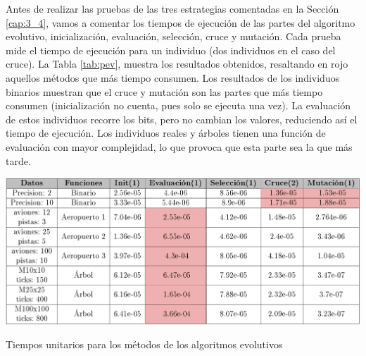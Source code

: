 		Antes de realizar las pruebas de las tres estrategias comentadas en la Sección \ref{cap:3_4}, vamos a comentar los tiempos de ejecución de las partes del algoritmo evolutivo, inicialización, evaluación, selección, cruce y mutación. Cada prueba mide el tiempo de ejecución para un individuo (dos individuos en el caso del cruce). La Tabla \ref{tab:pev}, muestra los resultados obtenidos, resaltando en rojo aquellos métodos que más tiempo consumen. Los resultados de los individuos binarios muestran que el cruce y mutación son las partes que más tiempo consumen (inicialización no cuenta, pues solo se ejecuta una vez). La evaluación de estos individuos recorre los bits, pero no cambian los valores, reduciendo así el tiempo de ejecución. Los individuos reales y árboles tienen una función de evaluación con mayor complejidad, lo que provoca que esta parte sea la que más tarde. 
		
		
		
		\begin{table}[!h]
			\centering
			\includegraphics[width=1\textwidth]{images/chapter_4/tabla_pev}		
			\caption{Tiempos unitarios para los métodos de los algoritmos evolutivos}
			\label{tab:pev}
		\end{table}
		
